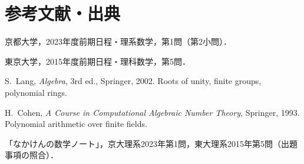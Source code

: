 \documentclass[a5paper,10pt,onecolumn]{jsarticle}
\theoremstyle{mathnotetheorem}
\begin{document}
\section*{参考文献・出典}
\begin{enumerate}[label={[\arabic*]}]
\item 京都大学，2023年度前期日程・理系数学，第1問（第2小問）．
\item 東京大学，2015年度前期日程・理科数学，第5問．
\item S.~Lang, \textit{Algebra}, 3rd ed., Springer, 2002. Roots of unity, finite groups, polynomial rings.
\item H.~Cohen, \textit{A Course in Computational Algebraic Number Theory}, Springer, 1993. Polynomial arithmetic over finite fields.
\item 「なかけんの数学ノート」，京大理系2023年第1問，東大理系2015年第5問（出題事項の照合）．
\end{enumerate}
\end{document}
